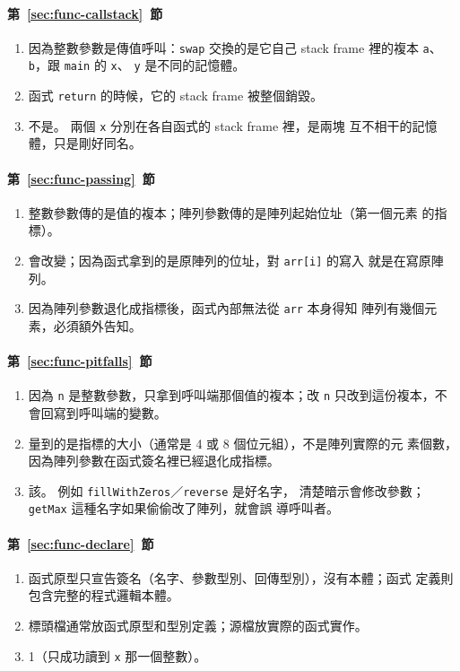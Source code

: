 \paragraph{第~\ref{sec:func-callstack}~節}
\begin{enumerate}
\item 因為整數參數是傳值呼叫：\texttt{swap} 交換的是它自己 stack
frame 裡的複本 \texttt{a}、\texttt{b}，跟 \texttt{main} 的 \texttt{x}、
\texttt{y} 是不同的記憶體。
\item 函式 \texttt{return} 的時候，它的 stack frame 被整個銷毀。
\item 不是。 兩個 \texttt{x} 分別在各自函式的 stack frame 裡，是兩塊
互不相干的記憶體，只是剛好同名。
\end{enumerate}

\paragraph{第~\ref{sec:func-passing}~節}
\begin{enumerate}
\item 整數參數傳的是值的複本；陣列參數傳的是陣列起始位址（第一個元素
的指標）。
\item 會改變；因為函式拿到的是原陣列的位址，對 \texttt{arr[i]} 的寫入
就是在寫原陣列。
\item 因為陣列參數退化成指標後，函式內部無法從 \texttt{arr} 本身得知
陣列有幾個元素，必須額外告知。
\end{enumerate}

\paragraph{第~\ref{sec:func-pitfalls}~節}
\begin{enumerate}
\item 因為 \texttt{n} 是整數參數，只拿到呼叫端那個值的複本；改
\texttt{n} 只改到這份複本，不會回寫到呼叫端的變數。
\item 量到的是指標的大小（通常是 4 或 8 個位元組），不是陣列實際的元
素個數，因為陣列參數在函式簽名裡已經退化成指標。
\item 該。 例如 \texttt{fillWithZeros}／\texttt{reverse} 是好名字，
清楚暗示會修改參數；\texttt{getMax} 這種名字如果偷偷改了陣列，就會誤
導呼叫者。
\end{enumerate}

\paragraph{第~\ref{sec:func-declare}~節}
\begin{enumerate}
\item 函式原型只宣告簽名（名字、參數型別、回傳型別），沒有本體；函式
定義則包含完整的程式邏輯本體。
\item 標頭檔通常放函式原型和型別定義；源檔放實際的函式實作。
\item 1（只成功讀到 \texttt{x} 那一個整數）。
\end{enumerate}

